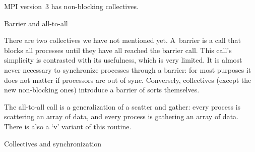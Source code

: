 MPI version~3 has non-blocking collectives.

 {Barrier and all-to-all}

There are two collectives we have not mentioned yet. A~barrier is a
call that blocks all processes until they have all reached the barrier
call. This call's simplicity is contrasted with its usefulness, which
is very limited. It is almost never necessary to synchronize processes
through a barrier: for most purposes it does not matter if processors
are out of sync. Conversely, collectives (except the new non-blocking
ones) introduce a barrier of sorts themselves.

The all-to-all call is a generalization of a scatter and gather: every
process is scattering an array of data, and every process is gathering
an array of data. There is also a `v' variant of this routine.

 {Collectives and synchronization}

